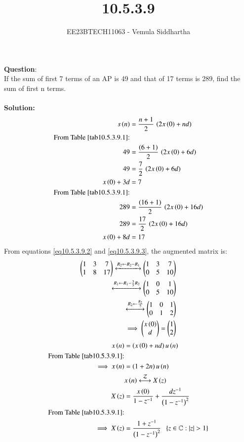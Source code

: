 \documentclass[journal,12pt,twocolumn]{IEEEtran}
\theoremstyle{remark}
\begin{document}

\vspace{3cm}

\title{10.5.3.9}
\author{EE23BTECH11063 - Vemula Siddhartha
}
\maketitle
\newpage
\bigskip

\renewcommand{\thefigure}{\theenumi}
\renewcommand{\thetable}{\theenumi}
\textbf{Question}:\\
If the sum of first 7 terms of an AP is 49 and that of 17 terms is 289, find the sum of
first n terms.
\\\\
\textbf{Solution: }
\begin{align}
s\brak{n}&=\frac{n+1}{2}\,\brak{2x\brak{0}+nd}\label{eq10.5.3.9.1}\\
\text{From \tabref{tab10.5.3.9.1}:}\notag\\
49&=\frac{\brak{6+1}}{2}\,\brak{2x\brak{0}+6d}  \\
49&=\frac{7}{2}\,\brak{2x\brak{0}+6d}  \\
x\brak{0}+3d&=7\label{eq10.5.3.9.2}\\
\text{From \tabref{tab10.5.3.9.1}:}\notag  \\
289&=\frac{\brak{16+1}}{2}\,\brak{2x\brak{0}+16d}  \\
289&=\frac{17}{2}\,\brak{2x\brak{0}+16d}  \\
x\brak{0}+8d&=17 \label{eq10.5.3.9.3}
\end{align}
From  equations \ref{eq10.5.3.9.2} and \ref{eq10.5.3.9.3}, the augmented matrix is:
\begin{align}
 \begin{pmatrix}
   1 & 3 & 7
   \\
   1 & 8 & 17
 \end{pmatrix}
 \xleftrightarrow[]{R_2 \leftarrow {R_2-R_1}}
 \begin{pmatrix}
   1 & 3 & 7
   \\
   0 & 5 & 10
 \end{pmatrix}
 \\
 \xleftrightarrow[]{R_1 \leftarrow {R_1-\frac{3}{5}R_2}}
 \begin{pmatrix}
   1 & 0 & 1
   \\
   0 & 5 & 10
 \end{pmatrix}
 \\
 \xleftrightarrow[]{R_2 \leftarrow \frac{R_2}{5}}
 \begin{pmatrix}
   1 & 0 & 1
   \\
   0 & 1 & 2
 \end{pmatrix}
 \\
 \implies \begin{pmatrix}
   x\left(0\right)
   \\
   d
 \end{pmatrix}
 =
 \begin{pmatrix}
   1
   \\
   2
 \end{pmatrix}
\end{align}
\begin{align}
    x\brak{n}&=\brak{x\brak{0}+nd}u\brak{n}\\
    \text{From \tabref{tab10.5.3.9.1}:}\notag\\
    \implies x\brak{n}&= \brak{1+2n}u\brak{n}\\
    &x\brak{n}\system{Z}X\brak{z}\notag\\
    X\brak{z}&=\frac{x\brak{0}}{1-z^{-1}}+\frac{dz^{-1}}{\brak{1-z^{-1}}^2}\\
    \text{From \tabref{tab10.5.3.9.1}:}\notag\\
    \implies X\brak{z}&=\frac{1+z^{-1}}{\brak{1-z^{-1}}^2} \;\;\cbrak{z\in\mathbb{C}: |z|>1}
\end{align}
\end{document}
